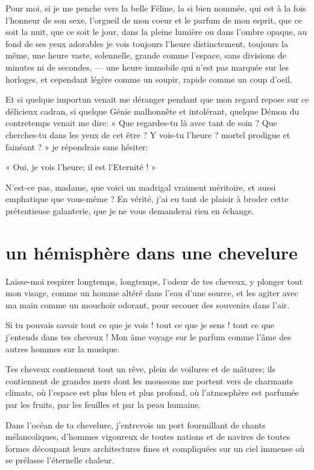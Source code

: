 Pour moi, si je me penche vers la belle Féline, la si bien nommée, qui
est à la fois l’honneur de son sexe,
l’orgueil de mon coeur et le parfum de mon esprit, que
ce soit la nuit, que ce soit le jour, dans la pleine lumière ou dans
l’ombre opaque, au fond de ses yeux adorables je vois
toujours l’heure distinctement, toujours la même, une
heure vaste, solennelle, grande comme l’espace, sans
divisions de minutes ni de secondes, --- une heure immobile qui
n’est pas marquée sur les horloges, et cependant
légère comme un soupir, rapide comme un coup d’oeil.

Et si quelque importun venait me déranger pendant que mon regard repose
sur ce délicieux cadran, si quelque Génie malhonnête et intolérant,
quelque Démon du contretemps venait me dire: « Que regardes{}-tu là
avec tant de soin ? Que cherches{}-tu dans les yeux de cet être ? Y
vois{}-tu l’heure ? mortel prodigue et fainéant ? » je
répondrais sans hésiter:

« Oui, je vois l’heure; il est
l’Eternité ! »

N’est{}-ce pas, madame, que voici un madrigal vraiment
méritoire, et aussi emphatique que vous{}-même ? En vérité,
j’ai eu tant de plaisir à broder cette prétentieuse
galanterie, que je ne vous demanderai rien en échange.

\quebra\section[Un hémisphère dans une chevelure]{un hémisphère dans une chevelure }

Laisse{}-moi respirer longtemps, longtemps, l’odeur de
tes cheveux, y plonger tout mon visage, comme un homme altéré dans
l’eau d’une source, et les agiter
avec ma main comme un mouchoir odorant, pour secouer des souvenirs dans
l’air.

Si tu pouvais savoir tout ce que je vois ! tout ce que je sens ! tout ce
que j’entends dans tes cheveux ! Mon âme voyage sur le
parfum comme l’âme des autres hommes sur la musique.

Tes cheveux contiennent tout un rêve, plein de voilures et de mâtures;
ils contiennent de grandes mers dont les moussons me portent vers de
charmants climats, où l’espace est plus bleu et plus
profond, où l’atmosphère est parfumée par les fruits,
par les feuilles et par la peau humaine.

Dans l’océan de ta chevelure,
j’entrevois un port fourmillant de chants
mélancoliques, d’hommes vigoureux de toutes nations et
de navires de toutes formes découpant leurs architectures fines et
compliquées sur un ciel immense où se prélasse
l’éternelle chaleur.

